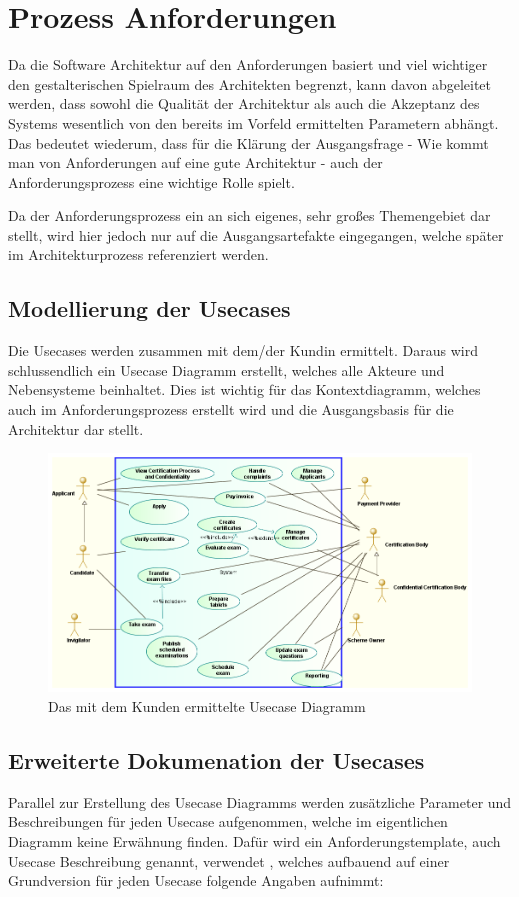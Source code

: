 \chapter{Prozess Anforderungen}
Da die Software Architektur auf den Anforderungen basiert und viel wichtiger \glqq den gestalterischen Spielraum des Architekten\grqq \cite[S. 103]{softarch} begrenzt, kann davon abgeleitet werden, dass sowohl die Qualität der Architektur als auch die Akzeptanz des Systems wesentlich von den bereits im Vorfeld ermittelten Parametern abhängt. Das bedeutet wiederum, dass für die Klärung der Ausgangsfrage - Wie kommt man von Anforderungen auf eine gute Architektur - auch der Anforderungsprozess eine wichtige Rolle spielt.

Da der Anforderungsprozess ein an sich eigenes, sehr großes Themengebiet dar stellt, wird hier jedoch nur auf die Ausgangsartefakte eingegangen, welche später im Architekturprozess referenziert werden.

\section{Modellierung der Usecases}
Die Usecases werden zusammen mit dem/der Kundin ermittelt. Daraus wird schlussendlich ein Usecase Diagramm erstellt, welches alle Akteure und Nebensysteme beinhaltet. Dies ist wichtig für das Kontextdiagramm, welches auch im Anforderungsprozess erstellt wird und die Ausgangsbasis für die Architektur dar stellt.

\begin{figure}[!htbp]
    \centering
    \includegraphics[scale=0.4]{uml/usecase.png}
    \caption{Das mit dem Kunden ermittelte Usecase Diagramm}
\end{figure}

\section{Erweiterte Dokumenation der Usecases}
Parallel zur Erstellung des Usecase Diagramms werden zusätzliche Parameter und Beschreibungen für jeden Usecase aufgenommen, welche im eigentlichen Diagramm keine Erwähnung finden.
Dafür wird ein Anforderungstemplate, auch Usecase Beschreibung genannt, verwendet \cite[S. 214]{reqman}, welches aufbauend auf einer Grundversion \cite[Abbildung 8.14, S. 215]{reqman} für jeden Usecase folgende Angaben aufnimmt:

